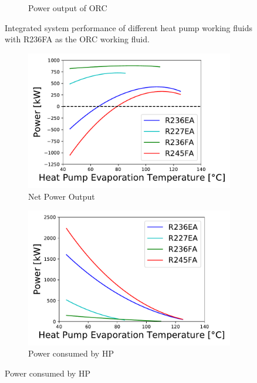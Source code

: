 \documentclass[a4paper,12pt]{article}
\begin{document}
\begin{figure}[H]
\begin{subfigure}[H]{.32\textwidth}
      \caption{Power output of ORC}
      \label{fig:P_ORC_HP}
    \end{subfigure}
\caption{Integrated system performance of different heat pump working fluids with R236FA as the ORC working fluid.}
\label{fig:Fluids_HP}
\end{figure}
\begin{figure}[H]
   \begin{subfigure}[H]{.32\textwidth}
      \centering
      \includegraphics[scale = 0.35]{Images/P_NET_FLUIDS_ORC.pdf}
      \caption{Net Power Output}
      \label{fig:P_NET_ORC}
    \end{subfigure}
    \begin{subfigure}[H]{.32\textwidth}
      \centering
      \includegraphics[scale = 0.35]{Images/P_HP_FLUIDS_ORC.pdf}
      \caption{Power consumed by HP}
      \label{fig:P_HP_ORC}
    \end{subfigure}

\end{figure}
\end{document}
